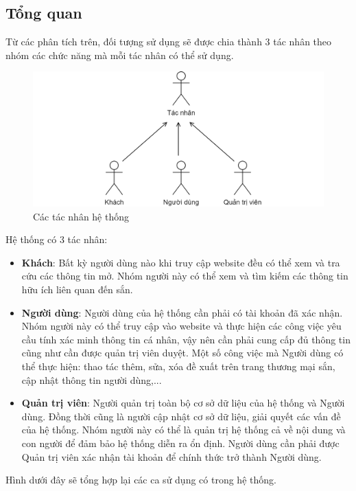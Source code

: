 \documentclass[./../main.tex]{subfiles}
\begin{document}
\subsection{Tổng quan}

Từ các phân tích trên, đối tượng sử dụng sẽ được chia thành 3 tác nhân theo nhóm các chức năng mà mỗi tác nhân có thể sử dụng.
\begin{figure}[H]
    \centering
    \includegraphics[width=\linewidth]{./img/actors.png}
    \caption{Các tác nhân hệ thống}
\end{figure}

Hệ thống có 3 tác nhân:
\begin{itemize}
    \item \textbf{Khách}: Bất kỳ người dùng nào khi truy cập website đều có thể xem và tra cứu các thông tin mở. Nhóm người này có thể xem và tìm kiếm các thông tin hữu ích liên quan đến sắn.
    \item \textbf{Người dùng}: Người dùng của hệ thống cần phải có tài khoản đã xác nhận. Nhóm người này có thể truy cập vào website và thực hiện các công việc yêu cầu tính xác minh thông tin cá nhân, vậy nên cần phải cung cấp đủ thông tin cũng như cần được quản trị viên duyệt. Một số công việc mà Người dùng có thể thực hiện: thao tác thêm, sửa, xóa đề xuất trên trang thương mại sắn, cập nhật thông tin người dùng,...
    \item \textbf{Quản trị viên}: Người quản trị toàn bộ cơ sở dữ liệu của hệ thống và Người dùng. Đồng thời cũng là người cập nhật cơ sở dữ liệu, giải quyết các vấn đề của hệ thống. Nhóm người này có thể  là quản trị hệ thống cả về nội dung và con người để đảm bảo hệ thống diễn ra ổn định. Người dùng cần phải được Quản trị viên xác nhận tài khoản để chính thức trở thành Người dùng.
\end{itemize}

Hình dưới đây sẽ tổng hợp lại các ca sử dụng có trong hệ thống.
\end{document}
